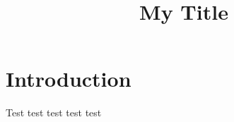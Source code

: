 \documentclass[11pt,twocolumn]{revtex4-2}
\begin{document}
\title{My Title}

\maketitle

\section{Introduction}

Test test test test test 

\lipsum
\end{document}
